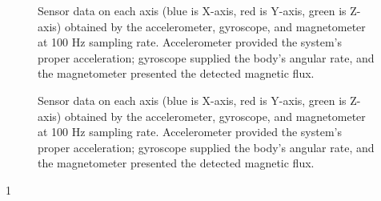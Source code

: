 
\begin{figure}
    \centering
    \resizebox{1\linewidth}{!}{}
    \caption{Sensor data on each axis (blue is X-axis, red is Y-axis, green is Z-axis) obtained by the accelerometer, gyroscope, and magnetometer at 100 Hz sampling rate. Accelerometer provided the system's proper acceleration; gyroscope supplied the body's angular rate, and the magnetometer presented the detected magnetic flux.}
    \label{fig:square3D}
\end{figure}

\begin{figure}
    \centering
    \resizebox{1\linewidth}{!}{}
    \caption{Sensor data on each axis (blue is X-axis, red is Y-axis, green is Z-axis) obtained by the accelerometer, gyroscope, and magnetometer at 100 Hz sampling rate. Accelerometer provided the system's proper acceleration; gyroscope supplied the body's angular rate, and the magnetometer presented the detected magnetic flux.}
    \label{fig:square3D}
\end{figure}1
